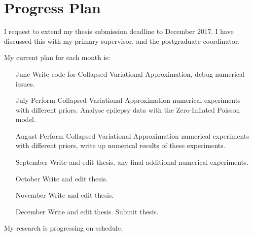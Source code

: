 \documentclass{letter}
\begin{document}
\section{Progress Plan}
I request to extend my thesis submission deadline to December 2017. I have discussed this with my
primary supervisor, and the postgraduate coordinator.

My current plan for each month is:
\begin{itemize}
\item[June] Write code for Collapsed Variational Approximation, debug
numerical issues.
\item[July] Perform Collapsed Variational Approximation numerical experiments
with different priors. Analyse
epilepsy data with the Zero-Inflated Poisson model.
\item[August] Perform Collapsed Variational Approximation numerical
experiments with different priors, write up
numerical results of these experiments.
\item[September] Write and edit thesis, any final additional numerical
experiments.
\item[October] Write and edit thesis.
\item[November] Write and edit thesis.
\item[December] Write and edit thesis. Submit thesis.
\end{itemize}

My research is progressing on schedule.
\end{document}
